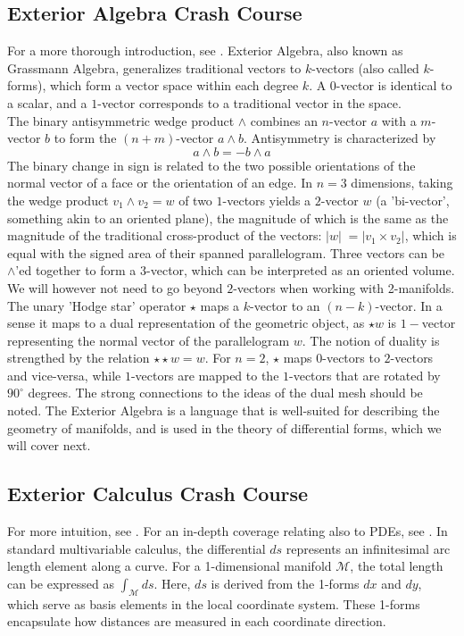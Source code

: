 \subsection*{Exterior Algebra Crash Course}
For a more thorough introduction, see \cite{craneDDG}.
Exterior Algebra, also known as Grassmann Algebra, generalizes traditional vectors to $k$-vectors (also called $k$-forms), which form a vector space within each degree $k$. A $0$-vector is identical to a scalar, and a $1$-vector corresponds to a traditional vector in the space.
\\
The binary antisymmetric wedge product $\wedge$ combines an $n$-vector $a$ with a $m$-vector $b$ to form the $(n+m)$-vector $a \wedge b$. Antisymmetry is characterized by $$a \wedge b = -b \wedge a$$
The binary change in sign is related to the two possible orientations of the normal vector of a face or the orientation of an edge. In $n=3$ dimensions, taking the wedge product $v_1 \wedge v_2 = w$ of two $1$-vectors yields a $2$-vector $w$ (a 'bi-vector', something akin to an oriented plane), the magnitude of which is the same as the magnitude of the traditional cross-product of the vectors: $|w| \;= |v_1 \times v_2|$, which is equal with the signed area of their spanned parallelogram. Three vectors can be $\wedge$'ed together to form a $3$-vector, which can be interpreted as an oriented volume. We will however not need to go beyond $2$-vectors when working with 2-manifolds.
\\
The unary 'Hodge star' operator $\star$ maps a $k$-vector to an $(n-k)$-vector. In a sense it maps to a dual representation of the geometric object, as $\star w$ is $1-$vector representing the normal vector of the parallelogram $w$. The notion of duality is strengthed by the relation $\star\star w = w$. For $n=2$, $\star$ maps $0$-vectors to $2$-vectors and vice-versa, while $1$-vectors are mapped to the $1$-vectors that are rotated by $90^\circ$ degrees. The strong connections to the ideas of the dual mesh should be noted. The Exterior Algebra is a language that is well-suited for describing the geometry of manifolds, and is used in the theory of differential forms, which we will cover next.

\subsection*{Exterior Calculus Crash Course}
For more intuition, see \cite{craneDDG}. For an in-depth coverage relating also to PDEs, see \cite{bryant1991exterior}. In standard multivariable calculus, the differential $ds$ represents an infinitesimal arc length element along a curve. For a 1-dimensional manifold $\mathcal{M}$, the total length can be expressed as $\int_{\mathcal{M}} ds$. Here, $ds$ is derived from the 1-forms $dx$ and $dy$, which serve as basis elements in the local coordinate system. These 1-forms encapsulate how distances are measured in each coordinate direction.


